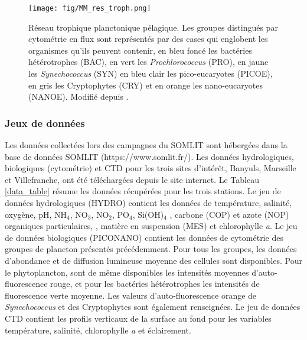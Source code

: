 \documentclass[12pt]{article}
\begin{document}
\begin{figure}
\centering
\texttt{[image: fig/MM\_res\_troph.png]}
\caption{Réseau trophique planctonique pélagique. Les groupes distingués par cytométrie en flux sont représentés par des cases qui englobent les organismes qu'ils peuvent contenir, en bleu foncé les bactéries hétérotrophes (BAC), en vert les \textit{Prochlorococcus} (PRO), en jaune les \textit{Synechococcus} (SYN) en bleu clair les pico-eucaryotes (PICOE), en gris les Cryptophytes (CRY) et en orange les nano-eucaryotes (NANOE). Modifié depuis \citet{Vage2015}.}
\label{groupes}
\end{figure}

\subsubsection{Jeux de données}

Les données collectées lors des campagnes du SOMLIT sont hébergées dans la base de données SOMLIT (https://www.somlit.fr/).  Les données hydrologiques, biologiques (cytométrie) et CTD pour les trois sites d’intérêt, Banyuls, Marseille et Villefranche, ont été téléchargées depuis le site internet.  Le Tableau \ref{data_table} résume les données récupérées pour les trois stations. Le jeu de données hydrologiques (HYDRO) contient les données de température, salinité, oxygène, pH, NH$_4$, NO$_3$, NO$_2$, PO$_4$, Si(OH)$_4$ , carbone (COP) et azote (NOP) organiques particulaires, , matière en suspension (MES) et  chlorophylle \textit{a}. Le jeu de données biologiques (PICONANO) contient les données de cytométrie des groupes de plancton présentés précédemment. Pour tous les groupes, les données d’abondance et de diffusion lumineuse moyenne des cellules sont disponibles. Pour le phytoplancton, sont de même disponibles les intensités moyennes d’auto-fluorescence rouge, et pour les bactéries hétérotrophes les intensités de fluorescence verte moyenne. Les valeurs d’auto-fluorescence orange de \textit{Synechococcus} et des Cryptophytes sont également renseignées. Le jeu de données CTD contient les profils verticaux de la surface au fond pour les variables température, salinité, chlorophylle \textit{a} et éclairement. 
\end{document}
